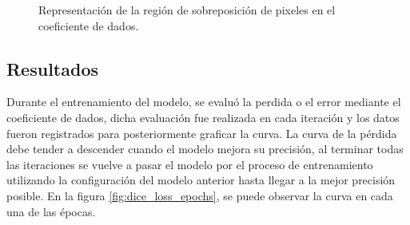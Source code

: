 \def\firstcircle{(0,0) circle (1.5cm)}
\def\secondcircle{(2,0) circle (1.5cm)}
\def\thirdcircle{(0:2cm) circle (1.5cm)}

\begin{figure}[!h]
    \centering
    \caption{Representación de la región de sobreposición de pixeles en el coeficiente de dados.}
\end{figure}

\subsection{Resultados}
Durante el entrenamiento del modelo, se evaluó la perdida o el error mediante el coeficiente de dados, dicha evaluación fue realizada en cada iteración y los datos fueron registrados para posteriormente graficar la curva. La curva de la pérdida debe tender a descender cuando el modelo mejora su precisión, al terminar todas las iteraciones se vuelve a pasar el modelo por el proceso de entrenamiento utilizando la configuración del modelo anterior hasta llegar a la mejor precisión posible. En la figura \ref{fig:dice_loss_epochs}, se puede observar la curva en cada una de las épocas.


